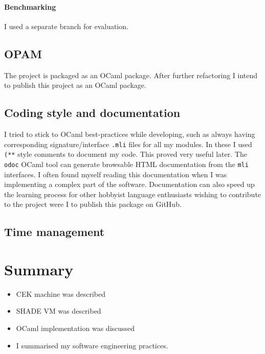 \documentclass[class=article, crop=false]{standalone}
\begin{document}
\paragraph{Benchmarking} I used a separate branch for evaluation.

\subsection{OPAM}

The project is packaged as an OCaml package. After further refactoring I
intend to publish this project as an OCaml package.

\subsection{Coding style and documentation}

I tried to stick to OCaml best-practices while developing, such as always
having corresponding signature/interface \verb|.mli| files for all my modules.
In these I used \verb|(**| style comments to document my code. This proved very
useful later. The \verb|odoc| OCaml tool can generate browsable HTML
documentation from the \verb|mli| interfaces. I often found myself reading
this documentation when I was implementing a complex part of the software.
Documentation can also speed up the learning process for other hobbyist language
enthusiasts wishing to contribute to the project were I to publish this package
on GitHub.


\subsection{Time management}

\section{Summary}

\begin{itemize}
    \item CEK machine was described
    \item SHADE VM was described
    \item OCaml implementation was discussed
    \item I summarised my software engineering practices.
\end{itemize}
\end{document}
